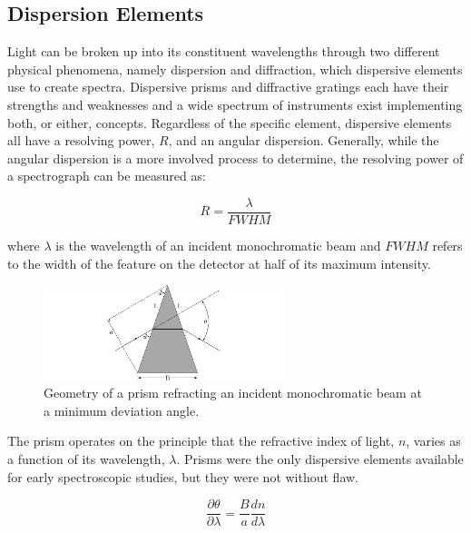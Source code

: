 \subsection{Dispersion Elements} \label{subsec:dispersion}

Light can be broken up into its constituent wavelengths through two different physical phenomena, namely dispersion and diffraction, which dispersive elements use to create spectra. Dispersive prisms and diffractive gratings each have their strengths and weaknesses and a wide spectrum of instruments exist implementing both, or either, concepts. Regardless of the specific element, dispersive elements all have a resolving power, $R$, and an angular dispersion. Generally, while the angular dispersion is a more involved process to determine, the resolving power of a spectrograph can be measured as:

\begin{equation}
    R = \frac{\lambda}{FWHM}
    \label{eq:resolving_power}
\end{equation}

\noindent where $\lambda$ is the wavelength of an incident monochromatic beam and $FWHM$ refers to the width of the feature on the detector at half of its maximum intensity.
\prgph

\begin{figure}[t]
    \centering
    \includegraphics[width = 7cm]{figures/2_prism_diagram.pdf}
    \caption{Geometry of a prism refracting an incident monochromatic beam at a minimum deviation angle.}
    \label{fig:prism_diagram}
\end{figure}

The prism operates on the principle that the refractive index of light, $n$, varies as a function of its wavelength, $\lambda$. Prisms were the only dispersive elements available for early spectroscopic studies, but they were not without flaw.

\begin{equation}
    \frac{\partial \theta}{\partial \lambda} = \frac{B}{a}\frac{dn}{d\lambda}%
    \label{eq:prism_angular_dispersion}
\end{equation}

